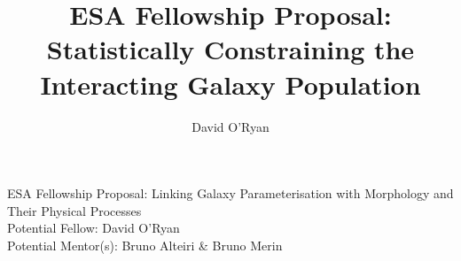 \documentclass[11pt,usenatbib]{article}
\title{ESA Fellowship Proposal: Statistically Constraining the Interacting Galaxy Population}
\author{David O'Ryan}
\begin{document}
    \begin{center}
        \large{{ESA Fellowship Proposal: Linking Galaxy Parameterisation with Morphology and Their Physical Processes \\
        Potential Fellow: David O'Ryan \\
        Potential Mentor(s): Bruno Alteiri \& Bruno Merin}}
    \end{center}
    
\end{document}
